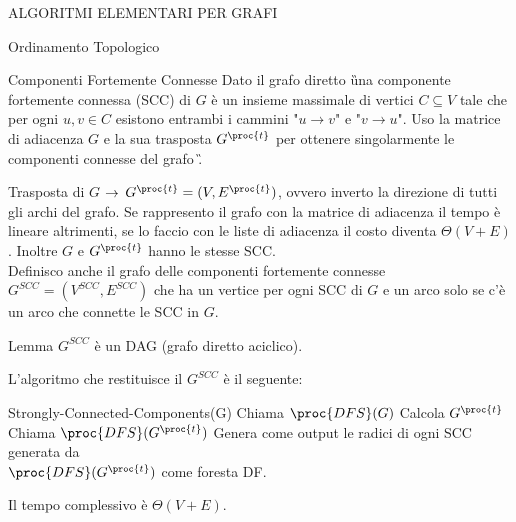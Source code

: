 \documentclass[8pt]{extarticle}
\begin{document}
\begin{formulario}
\begin{myParagraph}{ALGORITMI ELEMENTARI PER GRAFI}
\begin{subParagraph}{Ordinamento Topologico}
\begin{descr}{1}
 			\end{descr} 
		\end{subParagraph}
		\begin{subParagraph}{Componenti Fortemente Connesse}
Dato il grafo diretto \G una componente fortemente connessa (SCC) di $G$ è un insieme massimale di vertici $C\subseteq V$ tale che per ogni $u,v\in C$ esistono entrambi i cammini "$u\to v$" e "$v\to u$". Uso la matrice di adiacenza $G$ e la sua trasposta $G^\proc{t}$ per ottenere singolarmente le componenti connesse del grafo \G.
			\begin{Descr} 
				\item[Trasposta di $G$] $\rightarrow$ $G^\proc{t}=(V,E^\proc{t})$, ovvero inverto la direzione di tutti gli archi del grafo. Se rappresento il grafo con la matrice di adiacenza il tempo è lineare altrimenti, se lo faccio con le liste di adiacenza il costo diventa $\Theta(V+E)$. Inoltre $G$ e $G^\proc{t}$ hanno le stesse SCC.\\
Definisco anche il grafo delle componenti fortemente connesse $G^{SCC}=(V^{SCC},E^{SCC})$ che ha un vertice per ogni SCC di $G$ e un arco solo se c'è un arco che connette le SCC in $G$.  
				\item [Lemma] $G^{SCC}$ è un DAG (grafo diretto aciclico).
			\end{Descr}
L'algoritmo che restituisce il $G^{SCC}$ è il seguente:
			\begin{code}{Strongly-Connected-Components(G)}
\li Chiama $\proc{DFS}(G)$ 
\li Calcola $G^\proc{t}$ 
\li Chiama $\proc{DFS}(G^\proc{t})$ 
\li Genera come output le radici di ogni SCC generata da\\ $\proc{DFS}(G^\proc{t})$ come foresta DF. 
			\end{code}
		\end{subParagraph}
Il tempo complessivo è $\Theta(V+E)$.
		\end{myParagraph}


\end{formulario}
\end{document}
